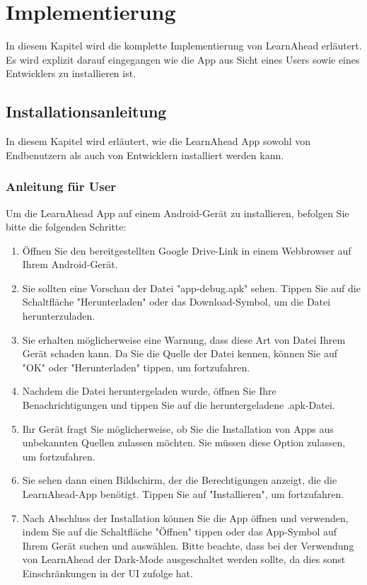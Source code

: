 \section{Implementierung}
In diesem Kapitel wird die komplette Implementierung von LearnAhead erläutert. Es wird explizit darauf eingegangen wie die App aus Sicht eines Users sowie eines Entwicklers zu installieren ist.\newline

\subsection{Installationsanleitung}
In diesem Kapitel wird erläutert, wie die LearnAhead App sowohl von Endbenutzern als auch von Entwicklern installiert werden kann.
\subsubsection{Anleitung für User}
Um die LearnAhead App auf einem Android-Gerät zu installieren, befolgen Sie bitte die folgenden Schritte: \newline
\begin{enumerate}
    \item Öffnen Sie den bereitgestellten Google Drive-Link in einem Webbrowser auf Ihrem Android-Gerät.
    \item Sie sollten eine Vorschau der Datei "app-debug.apk" sehen. Tippen Sie auf die Schaltfläche "Herunterladen" oder das Download-Symbol, um die Datei herunterzuladen.
    \item Sie erhalten möglicherweise eine Warnung, dass diese Art von Datei Ihrem Gerät schaden kann. Da Sie die Quelle der Datei kennen, können Sie auf "OK" oder "Herunterladen" tippen, um fortzufahren.
    \item Nachdem die Datei heruntergeladen wurde, öffnen Sie Ihre Benachrichtigungen und tippen Sie auf die heruntergeladene .apk-Datei.
    \item Ihr Gerät fragt Sie möglicherweise, ob Sie die Installation von Apps aus unbekannten Quellen zulassen möchten. Sie müssen diese Option zulassen, um fortzufahren.
    \item Sie sehen dann einen Bildschirm, der die Berechtigungen anzeigt, die die LearnAhead-App benötigt. Tippen Sie auf "Installieren", um fortzufahren.
    \item Nach Abschluss der Installation können Sie die App öffnen und verwenden, indem Sie auf die Schaltfläche "Öffnen" tippen oder das App-Symbol auf Ihrem Gerät suchen und auswählen. Bitte beachte, dass bei der Verwendung von LearnAhead der Dark-Mode ausgeschaltet werden sollte, da dies sonst Einschränkungen in der UI zufolge hat.
\end{enumerate}

